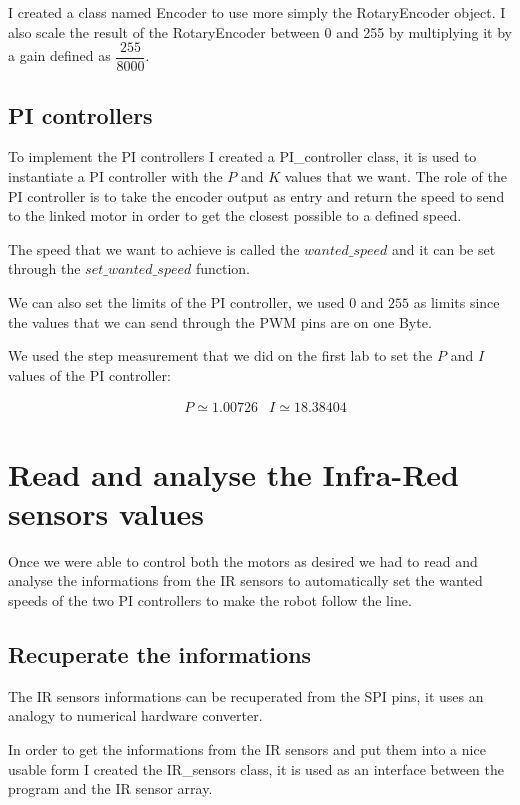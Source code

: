 I created a class named Encoder to use more simply the RotaryEncoder object.
I also scale the result of the RotaryEncoder between 0 and 255 by multiplying it by a gain defined as $\dfrac{255}{8000}$.

\subsection*{PI controllers}

To implement the PI controllers I created a PI\_controller class, it is used to instantiate a PI controller with the $P$ and $K$ values that we want.
The role of the PI controller is to take the encoder output as entry and return the speed to send to the linked motor in order to get the closest possible to a defined speed.

The speed that we want to achieve is called the $wanted\_speed$ and it can be set through the $set\_wanted\_speed$ function.

We can also set the limits of the PI controller, we used $0$ and $255$ as limits since the values that we can send through the PWM pins are on one Byte.

We used the step measurement that we did on the first lab to set the $P$ and $I$ values of the PI controller:

\begin{align*}
    &P \simeq 1.00726
    &I \simeq 18.38404
\end{align*}

\section*{Read and analyse the Infra-Red sensors values}

Once we were able to control both the motors as desired we had to read and analyse the informations from the IR sensors to automatically set the wanted speeds of the two PI controllers to make the robot follow the line.

\subsection*{Recuperate the informations}

The IR sensors informations can be recuperated from the SPI pins, it uses an analogy to numerical hardware converter.

In order to get the informations from the IR sensors and put them into a nice usable form I created the IR\_sensors class, it is used as an interface between the program and the IR sensor array.

